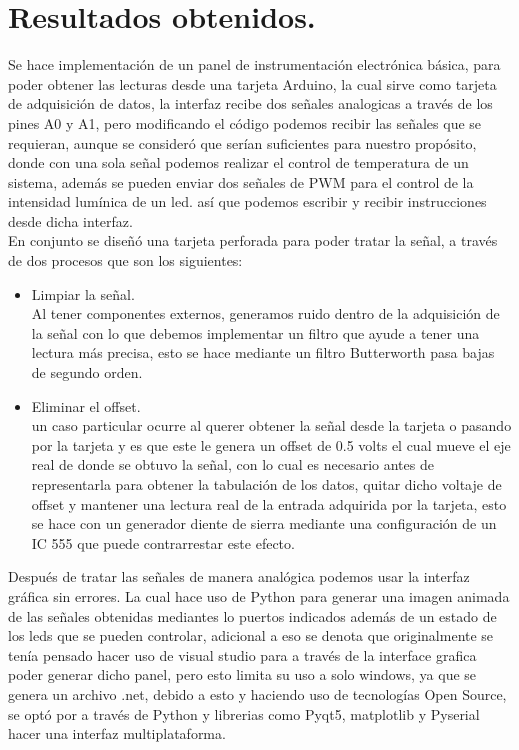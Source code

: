 \documentclass[a4paper,12pt]{article}
\begin{document}
    \section{Resultados obtenidos.}
        Se hace implementación de un panel de instrumentación electrónica básica, para poder obtener las lecturas desde una tarjeta Arduino, la cual sirve como tarjeta de adquisición de datos, la interfaz recibe dos señales analogicas a través de los pines A0 y A1, pero modificando el código podemos recibir las señales que se requieran, aunque se consideró que serían suficientes para nuestro propósito, donde con una sola señal podemos realizar el control de temperatura de un sistema,  además se pueden enviar dos señales de PWM para el control de la intensidad lumínica de un led. así que podemos escribir y recibir instrucciones desde dicha interfaz.\\
        En conjunto se diseñó una tarjeta perforada para poder tratar la señal, a través de dos procesos que son los siguientes:
        \begin{itemize}
            \item Limpiar la señal.\\
            Al tener componentes externos, generamos ruido dentro de la adquisición de la señal con lo que debemos implementar un filtro que ayude a tener una lectura más precisa, esto se hace mediante un filtro Butterworth pasa bajas de segundo orden. 
            
            \item Eliminar el offset.\\
            un caso particular ocurre al querer obtener la señal desde la tarjeta o pasando por la tarjeta y es que este le genera un offset de 0.5 volts el cual mueve el eje real de donde se obtuvo la señal, con lo cual es necesario antes de representarla para obtener la tabulación de los datos, quitar dicho voltaje de offset y mantener una lectura real de la entrada adquirida por la tarjeta, esto se hace con un generador diente de sierra mediante una configuración de un IC 555 que puede contrarrestar este efecto. 
        \end{itemize}
        
        Después de tratar las señales de manera analógica podemos usar la interfaz gráfica sin errores. La cual hace uso de Python para  generar una imagen animada de las señales obtenidas mediantes lo puertos indicados además de un estado de los leds que se pueden controlar, adicional a eso se denota que originalmente se tenía pensado hacer uso de visual studio para a través de la interface grafica poder generar dicho panel, pero esto limita su uso a solo windows, ya que se genera un archivo .net, debido a esto y haciendo uso de tecnologías Open Source, se optó por a través de Python y librerias como Pyqt5, matplotlib y Pyserial hacer una interfaz multiplataforma.
\end{document}
